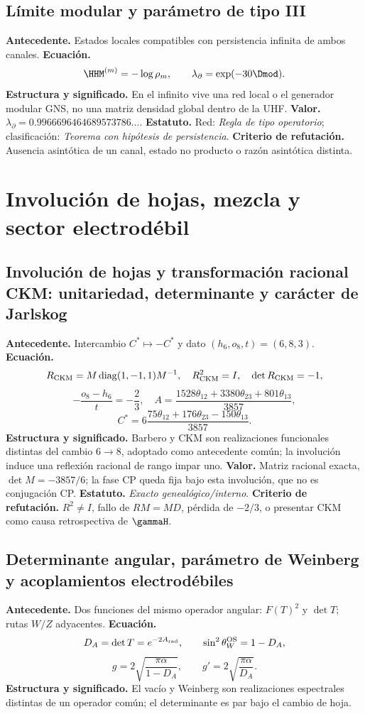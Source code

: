 \subsection*{L\'imite modular y par\'ametro de tipo III }
\textbf{Antecedente.} Estados locales compatibles con persistencia infinita de
ambos canales. \textbf{Ecuaci\'on.}
\[
\HHM^{(m)}=-\log\rho_m,
\qquad
\lambda_\partial=\exp(-30\Dmod).
\]
\textbf{Estructura y significado.} En el infinito vive una red local o el
generador modular GNS, no una matriz densidad global dentro de la UHF.
\textbf{Valor.}
\(\lambda_\partial=0.9966696464689573786\ldots\).
\textbf{Estatuto.} Red: \emph{Regla de tipo operatorio}; clasificaci\'on:
\emph{Teorema con hip\'otesis de persistencia}. \textbf{Criterio de refutación.} Ausencia
asint\'otica de un canal, estado no producto o raz\'on asint\'otica distinta.

\section{Involuci\'on de hojas, mezcla y sector electrod\'ebil}

\subsection*{Involución de hojas y transformación racional CKM: unitariedad, determinante y carácter de Jarlskog}
\textbf{Antecedente.} Intercambio \(C^*\mapsto-C^*\) y dato
\((h_6,o_8,t)=(6,8,3)\). \textbf{Ecuaci\'on.}
\[
R_{\rm CKM}=M\operatorname{diag}(1,-1,1)M^{-1},
\quad R_{\rm CKM}^2=I,\quad\det R_{\rm CKM}=-1,
\]
\[
-\frac{o_8-h_6}{t}=-\frac23,
\quad
A=\frac{1528\theta_{12}+3380\theta_{23}+801\theta_{13}}{3857},
\]
\[
C^*=6\frac{75\theta_{12}+176\theta_{23}-150\theta_{13}}{3857}.
\]
\textbf{Estructura y significado.} Barbero y CKM son realizaciones
funcionales distintas del cambio \(6\to8\), adoptado como antecedente
com\'un; la involuci\'on induce una reflexi\'on racional de rango impar uno.
\textbf{Valor.} Matriz racional exacta, \(\det M=-3857/6\); la fase CP
queda fija bajo esta involuci\'on, que no es conjugaci\'on CP.
\textbf{Estatuto.} \emph{Exacto geneal\'ogico/interno}.
\textbf{Criterio de refutación.} \(R^2\ne I\), fallo de \(RM=MD\), p\'erdida de
\(-2/3\), o presentar CKM como causa retrospectiva de \(\gammaH\).

\subsection*{Determinante angular, parámetro de Weinberg y acoplamientos electrodébiles}
\textbf{Antecedente.} Dos funciones del mismo operador angular:
\(F(T)^2\) y \(\det T\); rutas \(W/Z\) adyacentes.
\textbf{Ecuaci\'on.}
\[
D_A=\det T=e^{-2A_{\rm rad}},
\qquad \sin^2\theta_W^{\rm OS}=1-D_A,
\]
\[
g=2\sqrt{\frac{\pi\alpha}{1-D_A}},
\qquad g'=2\sqrt{\frac{\pi\alpha}{D_A}}.
\]
\textbf{Estructura y significado.} El vac\'io y Weinberg son realizaciones
espectrales distintas de un operador com\'un; el determinante es par bajo el
cambio de hoja.

